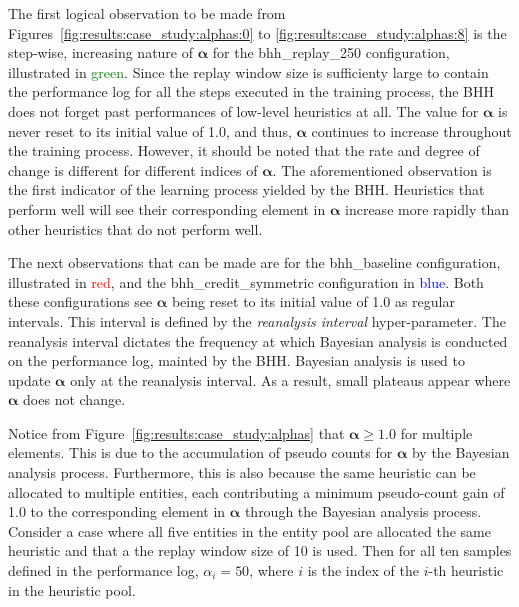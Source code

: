 The first logical observation to be made from Figures~\ref{fig:results:case_study:alphas:0} to \ref{fig:results:case_study:alphas:8} is the step-wise, increasing nature of $\boldsymbol{\alpha}$ for the bhh\_replay\_250 configuration, illustrated in \textcolor{green}{green}. Since the replay window size is sufficienty large to contain the performance log for all the steps executed in the training process, the \acs{BHH} does not forget past performances of low-level heuristics at all. The value for $\boldsymbol{\alpha}$ is never reset to its initial value of 1.0, and thus, $\boldsymbol{\alpha}$ continues to increase throughout the training process. However, it should be noted that the rate and degree of change is different for different indices of $\boldsymbol{\alpha}$. The aforementioned observation is the first indicator of the learning process yielded by the \acs{BHH}. Heuristics that perform well will see their corresponding element in $\boldsymbol{\alpha}$ increase more rapidly than other heuristics that do not perform well.

The next observations that can be made are for the bhh\_baseline configuration, illustrated in \textcolor{red}{red}, and the bhh\_credit\_symmetric configuration in \textcolor{blue}{blue}. Both these configurations see $\boldsymbol{\alpha}$ being reset to its initial value of 1.0 as regular intervals. This interval is defined by the \textit{reanalysis interval} hyper-parameter. The reanalysis interval dictates the frequency at which Bayesian analysis is conducted on the performance log, mainted by the \acs{BHH}. Bayesian analysis is used to update $\boldsymbol{\alpha}$ only at the reanalysis interval. As a result, small plateaus appear where $\boldsymbol{\alpha}$ does not change.

Notice from Figure~\ref{fig:results:case_study:alphas} that $\boldsymbol{\alpha} \geq 1.0$ for multiple elements. This is due to the accumulation of pseudo counts for $\boldsymbol{\alpha}$ by the Bayesian analysis process. Furthermore, this is also because the same heuristic can be allocated to multiple entities, each contributing a minimum pseudo-count gain of 1.0 to the corresponding element in $\boldsymbol{\alpha}$ through the Bayesian analysis process. Consider a case where all five entities in the entity pool are allocated the same heuristic and that a the replay window size of 10 is used. Then for all ten samples defined in the performance log, $\alpha_{i} = 50$, where $i$ is the index of the $i$-th heuristic in the heuristic pool.


